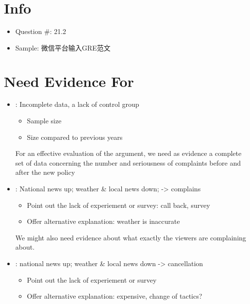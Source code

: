 \documentclass{article}
\begin{document}
  \section{Info}
    \begin{itemize}
      \item Question \#: 21.2
      \item Sample: 微信平台输入GRE范文
    \end{itemize}

  \section{Need Evidence For}

    \begin{itemize}
      \item {}: Incomplete data, a lack of control group
      \begin{itemize}
        \item Sample size
        \item Size compared to previous years
      \end{itemize}

      For an effective evaluation of the argument, we need as evidence a
      complete set of data concerning the number and seriousness of
      complaints before and after the new policy

      \item {}: National news up; weather \&
      local news down; -> complains
      \begin{itemize}
        \item Point out the lack of experiement or survey: call back, survey
        \item Offer alternative explanation: weather is inaccurate
      \end{itemize}

      We might also need evidence about what exactly the viewers are
      complaining about.

      \item {}: national news up; weather \& local news
      down -> cancellation
      \begin{itemize}
        \item Point out the lack of experiement or survey
        \item Offer alternative explanation: expensive, change of tactics?
      \end{itemize}


\end{itemize}
\end{document}
